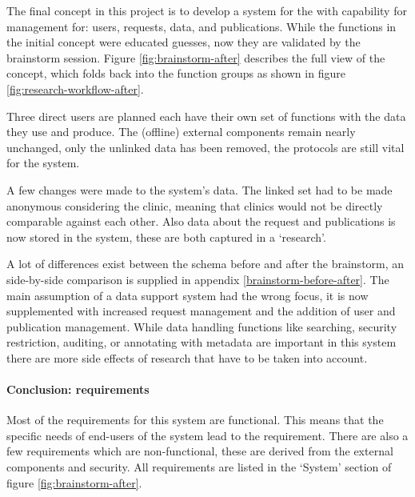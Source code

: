 The final concept in this project is to develop a system for the \projectdata{} with capability for management for: users, requests, data, and publications.
While the functions in the initial concept were educated guesses, now they are validated by the brainstorm session.
Figure \ref{fig:brainstorm-after} describes the full view of the concept, which folds back into the function groups as shown in figure \ref{fig:research-workflow-after}.

Three direct users are planned each have their own set of functions with the data they use and produce.
The (offline) external components remain nearly unchanged, only the unlinked data has been removed, the protocols are still vital for the system.

A few changes were made to the system's data.
The linked set had to be made anonymous considering the clinic, meaning that clinics would not be directly comparable against each other.
Also data about the request and publications is now stored in the system, these are both captured in a `research'.

A lot of differences exist between the schema before and after the brainstorm, an side-by-side comparison is supplied in appendix \ref{brainstorm-before-after}.
The main assumption of a data support system had the wrong focus, it is now supplemented with increased request management and the addition of user and publication management.
While data handling functions like searching, security restriction, auditing, or annotating with metadata are important in this system there are more side effects of research that have to be taken into account.

\paragraph{Conclusion: requirements}
Most of the requirements for this system are functional.
This means that the specific needs of end-users of the system lead to the requirement.
There are also a few requirements which are non-functional, these are derived from the external components and security.
All requirements are listed in the `System' section of figure \ref{fig:brainstorm-after}.

